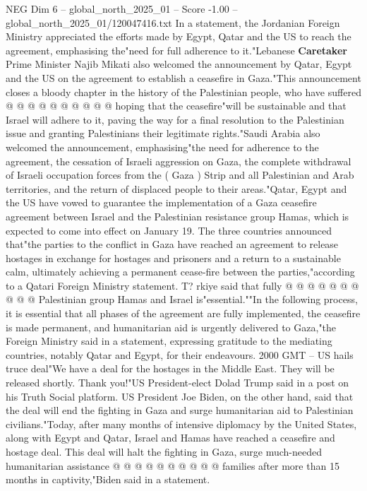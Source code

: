 \begin{textsample}{NEG Dim 6 – global\_north\_2025\_01 – Score -1.00 – global\_north\_2025\_01/120047416.txt}
In a statement, the Jordanian Foreign Ministry appreciated the efforts made by Egypt, Qatar and the US to reach the agreement, emphasising the"need for full adherence to it."Lebanese \textbf{Caretaker} Prime Minister Najib Mikati also welcomed the announcement by Qatar, Egypt and the US on the agreement to establish a ceasefire in Gaza."This announcement closes a bloody chapter in the history of the Palestinian people, who have suffered @ @ @ @ @ @ @ @ @ @ hoping that the ceasefire"will be sustainable and that Israel will adhere to it, paving the way for a final resolution to the Palestinian issue and granting Palestinians their legitimate rights."Saudi Arabia also welcomed the announcement, emphasising"the need for adherence to the agreement, the cessation of Israeli aggression on Gaza, the complete withdrawal of Israeli occupation forces from the ( Gaza ) Strip and all Palestinian and Arab territories, and the return of displaced people to their areas."Qatar, Egypt and the US have vowed to guarantee the implementation of a Gaza ceasefire agreement between Israel and the Palestinian resistance group Hamas, which is expected to come into effect on January 19.
The three countries announced that"the parties to the conflict in Gaza have reached an agreement to release hostages in exchange for hostages and prisoners and a return to a sustainable calm, ultimately achieving a permanent cease-fire between the parties,"according to a Qatari Foreign Ministry statement.
T? rkiye said that fully @ @ @ @ @ @ @ @ @ @ Palestinian group Hamas and Israel is"essential.""In the following process, it is essential that all phases of the agreement are fully implemented, the ceasefire is made permanent, and humanitarian aid is urgently delivered to Gaza,"the Foreign Ministry said in a statement, expressing gratitude to the mediating countries, notably Qatar and Egypt, for their endeavours. 2000 GMT -- US hails truce deal"We have a deal for the hostages in the Middle East.
They will be released shortly.
Thank you!"US President-elect Dolad Trump said in a post on his Truth Social platform.
US President Joe Biden, on the other hand, said that the deal will end the fighting in Gaza and surge humanitarian aid to Palestinian civilians."Today, after many months of intensive diplomacy by the United States, along with Egypt and Qatar, Israel and Hamas have reached a ceasefire and hostage deal.
This deal will halt the fighting in Gaza, surge much-needed humanitarian assistance @ @ @ @ @ @ @ @ @ @ families after more than 15 months in captivity,"Biden said in a statement.

\end{textsample}
